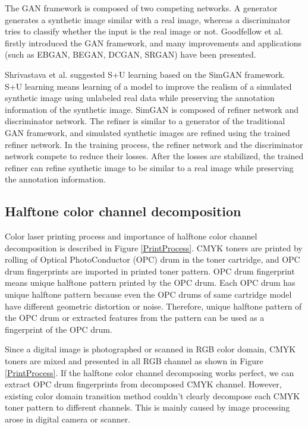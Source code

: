 \documentclass[5p, times]{elsarticle}
\begin{document}
The GAN framework is composed of two competing networks. A generator generates a synthetic image similar with a real image, whereas a discriminator tries to classify whether the input is the real image or not. Goodfellow et al. \cite{Gan} firstly introduced the GAN framework, and many improvements and applications (such as EBGAN\cite{ebgan}, BEGAN\cite{began}, DCGAN\cite{dcgan}, SRGAN\cite{srgan}) have been presented.

Shrivastava et al. \cite{SimGan} suggested S+U learning based on the SimGAN framework. S+U learning means learning of a model to improve the realism of a simulated synthetic image using unlabeled real data while preserving the annotation information of the synthetic image. SimGAN is composed of refiner network and discriminator network. The refiner is similar to a generator of the traditional GAN framework, and simulated synthetic images are refined using the trained refiner network. In the training process, the refiner network and the discriminator network compete to reduce their losses. After the losses are stabilized, the trained refiner can refine synthetic image to be similar to a real image while preserving the annotation information.

\subsection{Halftone color channel decomposition}

Color laser printing process and importance of halftone color channel decomposition is described in Figure \ref{PrintProcess}. CMYK toners are printed by rolling of Optical PhotoConductor (OPC) drum in the toner cartridge, and OPC drum fingerprints are imported in printed toner pattern. OPC drum fingerprint means unique halftone pattern printed by the OPC drum. Each OPC drum has unique halftone pattern because even the OPC drums of same cartridge model have different geometric distortion or noise. Therefore, unique halftone pattern of the OPC drum or extracted features from the pattern can be used as a fingerprint of the OPC drum.

Since a digital image is photographed or scanned in RGB color domain,  CMYK toners are mixed and presented in all RGB channel as shown in Figure \ref{PrintProcess}. If the halftone color channel decomposing works perfect, we can extract OPC drum fingerprints from decomposed CMYK channel. However, existing color domain transition method couldn't clearly decompose each CMYK toner pattern to different channels. This is mainly caused by image processing arose in digital camera or scanner.
\end{document}

